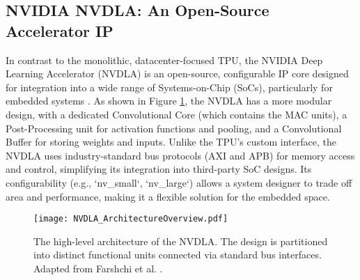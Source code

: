 \subsection{NVIDIA NVDLA: An Open-Source Accelerator IP}
In contrast to the monolithic, datacenter-focused TPU, the NVIDIA Deep Learning Accelerator (NVDLA) is an open-source, configurable IP core designed for integration into a wide range of Systems-on-Chip (SoCs), particularly for embedded systems \cite{farshchi2019nvdla}. As shown in Figure \ref{fig:nvdla_diagram}, the NVDLA has a more modular design, with a dedicated Convolutional Core (which contains the MAC units), a Post-Processing unit for activation functions and pooling, and a Convolutional Buffer for storing weights and inputs. Unlike the TPU's custom interface, the NVDLA uses industry-standard bus protocols (AXI and APB) for memory access and control, simplifying its integration into third-party SoC designs. Its configurability (e.g., `nv\_small`, `nv\_large`) allows a system designer to trade off area and performance, making it a flexible solution for the embedded space.

\begin{figure}[htbp]
    \centering
    \texttt{[image: NVDLA\_ArchitectureOverview.pdf]} 
    \caption[The NVDLA High-Level Architecture]{The high-level architecture of the NVDLA. The design is partitioned into distinct functional units connected via standard bus interfaces. Adapted from Farshchi et al. \cite{farshchi2019nvdla}.}
    \label{fig:nvdla_diagram}
\end{figure}

